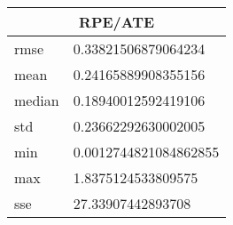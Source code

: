 \begin{table}[!ht] 
 \centering 
 \begin{tabular}{|l|l|} \hline 
 \multicolumn{2}{|c|}{RPE/ATE} \\ \hline 
 rmse & 0.33821506879064234 \\ \hline 
mean & 0.24165889908355156 \\ \hline 
median & 0.18940012592419106 \\ \hline 
std & 0.23662292630002005 \\ \hline 
min & 0.0012744821084862855 \\ \hline 
max & 1.8375124533809575 \\ \hline 
sse & 27.33907442893708 \\ \hline 
\end{tabular} 
 \end{table}